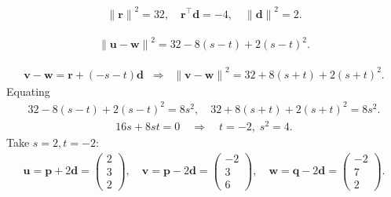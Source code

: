 \documentclass{beamer}
\theoremstyle{remark}
\providecommand{\norm}[1]{\lVert#1\rVert}
\newcommand{\myvec}[1]{\ensuremath{\begin{pmatrix}#1\end{pmatrix}}}
\let\vec\mathbf
\numberwithin{equation}{section}
\begin{document}
\begin{frame}
\begin{align}
{\norm{\vec{r}}}^2=32,\quad \vec{r}^\top\vec{d}=-4,\quad {\norm{\vec{d}}}^2=2.
\end{align}

\begin{align}
{\norm{\vec{u}-\vec{w}}}^2=32-8(s-t)+2(s-t)^2.
\end{align}

\begin{align}
\vec{v}-\vec{w}=\vec{r}+(-s-t)\vec{d} \;\;\Rightarrow\;\;
{\norm{\vec{v}-\vec{w}}}^2=32+8(s+t)+2(s+t)^2.
\end{align}
Equating
\begin{align}
32-8(s-t)+2(s-t)^2=8s^2, \quad
32+8(s+t)+2(s+t)^2=8s^2.
\end{align}
\begin{align}
16s+8st=0 \quad\Rightarrow\quad t=-2,\; s^2=4.
\end{align}
Take $ s=2,t=-2:$
\begin{align}
\vec{u}=\vec{p}+2\vec{d}=\myvec {2\\3\\2},\quad
\vec{v}=\vec{p}-2\vec{d}=\myvec {-2\\3\\6},\quad
\vec{w}=\vec{q}-2\vec{d}=\myvec{-2\\7\\2}.
\end{align}

\end{frame}
\end{document}
